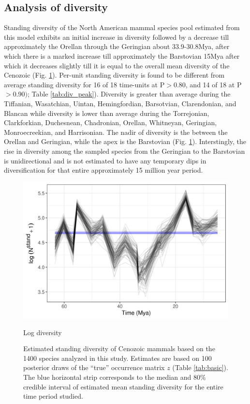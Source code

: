 \documentclass[12pt,letterpaper]{article}
\begin{document}
\subsection*{Analysis of diversity}
Standing diversity of the North American mammal species pool estimated from this model exhibits an initial increase in diversity followed by a decrease till approximately the Orellan through the Geringian about 33.9-30.8Mya, after which there is a marked increase till approximately the Barstovian 15Mya after which it decreases slightly till it is equal to the overall mean diversity of the Cenozoic (Fig. \ref{fig:diversity_est}). Per-unit standing diversity is found to be different from average standing diversity for 16 of 18 time-units at P\(>\)0.80, and 14 of 18 at P\(>0.90)\); Table \ref{tab:div_peak}). Diversity is greater than average during the Tiffanian, Wasatchian, Uintan, Hemingfordian, Barsotvian, Clarendonian, and Blancan while diversity is lower than average during the Torrejonian, Clarkforkian, Duchesnean, Chadronian, Orellan, Whitneyan, Geringian, Monroecreekian, and Harrisonian. The nadir of diversity is the between the Orellan and Geringian, while the apex is the Barstovian (Fig. \ref{fig:diversity_est}). Interstingly, the rise in diversity among the sampled species from the Geringian to the Barstovian is unidirectional and is not estimated to have any temporary dips in diversification for that entire approximately 15 million year period.
\begin{figure}[ht]
  \centering
  \includegraphics[width=\textwidth,height=0.5\textheight,keepaspectratio=true]{figure/log_diversity}
  \caption{Log diversity}
  \caption{Estimated standing diversity of Cenozoic mammals based on the 1400 species analyzed in this study. Estimates are based on 100 posterior draws of the ``true'' occurrence matrix \(z\) (Table \ref{tab:basic}). The blue horizontal strip corresponds to the median and 80\% credible interval of estimated mean standing diversity for the entire time period studied.} 
  \label{fig:diversity_est}
\end{figure}
\end{document}
